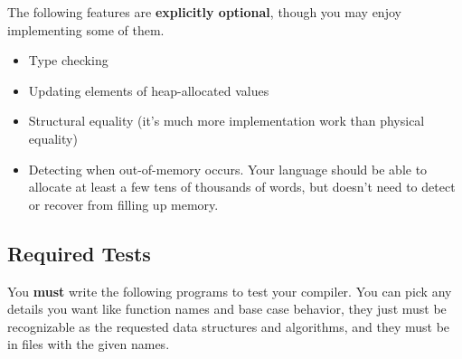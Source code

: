 \documentclass[10pt, oneside]{article}
\begin{document}
The following features are {\bf explicitly optional}, though you may enjoy
implementing some of them.

\begin{itemize}
\item Type checking
\item Updating elements of heap-allocated values
\item Structural equality (it's much more implementation work than physical equality)
\item Detecting when out-of-memory occurs. Your language should be able to
allocate at least a few tens of thousands of words, but doesn't need to
detect or recover from filling up memory.
\end{itemize}

\subsection*{Required Tests}

You {\bf must} write the following programs to test your compiler. You can
pick any details you want like function names and base case behavior, they
just must be recognizable as the requested data structures and algorithms,
and they must be in files with the given names.
\end{document}
